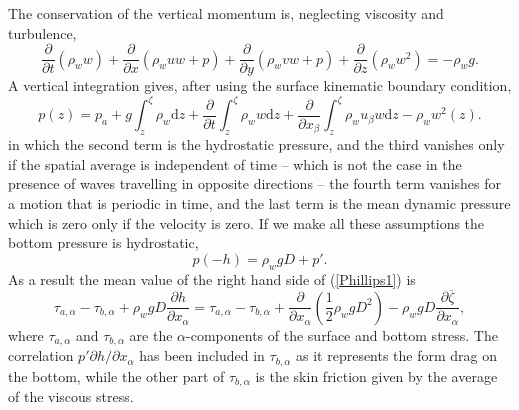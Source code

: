 The conservation of the vertical momentum is, neglecting viscosity and turbulence, 
\begin{equation}
 \frac{\partial }{\partial t} \left(\rho_w w\right)+ \frac{\partial }{\partial x} 
\left(\rho_w u w   + p  \right) + \frac{\partial }{\partial y} 
\left(\rho_w v w   + p  \right)+ \frac{\partial }{\partial z} \left(\rho_w w^2 \right)   = - \rho_w g.
\end{equation}
A vertical integration gives, after using the surface kinematic boundary condition, 
\begin{equation}
 p(z)=p_a + g\int_{z}^{\zeta} \rho_w \mathrm{d}z + \frac{\partial }{\partial t} \int_{z}^{\zeta} \rho_w w  \mathrm{d}z  
+ \frac{\partial }{\partial x_\beta} \int_{z}^{\zeta} \rho_w  u_\beta w  \mathrm{d}z
- \rho_w w^2(z).\label{p_z}
\end{equation}
in which the second term is the hydrostatic pressure, and the third
vanishes only if the spatial average is independent of time -- which is not the case in the presence of waves travelling in opposite directions  --  
the fourth term vanishes for a motion that is periodic in time, and the 
last term is the mean dynamic pressure which is zero only if the velocity is zero.  If we make all these assumptions 
the bottom pressure is hydrostatic, 
\begin{equation}
 p(-h)=\rho_w g D + p'.
\end{equation}
As a result the mean value of the right hand side of (\ref{Phillips1}) is 
\begin{equation}
\tau_{a,\alpha} - \tau_{b,\alpha} + \rho_w g D \frac{\partial h}{\partial x_\alpha}= \tau_{a,\alpha} - \tau_{b,\alpha} + \frac{\partial }{\partial x_\alpha}\left(\frac{1}{2} \rho_w g D^2 \right)
-\rho_w g D \frac{\partial \overline{\zeta}}{\partial x_\alpha},
\end{equation}
where $\tau_{a,\alpha}$  and $\tau_{b,\alpha}$ are the $\alpha$-components of the surface and bottom stress. 
The correlation $p' \partial h/ \partial x_\alpha$ has been included in $\tau_{b,\alpha}$ as it represents the form drag 
on the bottom, while the other part of $\tau_{b,\alpha}$ is the skin friction given by the average of the viscous stress. 

